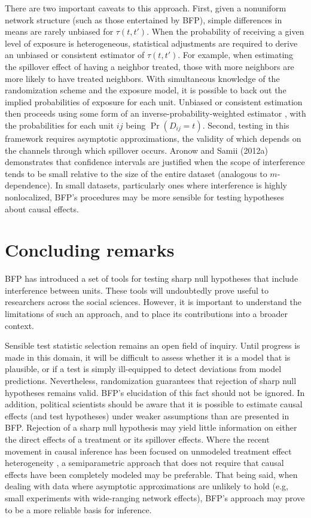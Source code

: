 \documentclass[12pt]{article}
\newcommand{\0}{\mathbf{0}}
\begin{document}
There are two important caveats to this approach. First, given a nonuniform network structure (such as those entertained by BFP), simple differences in means are rarely unbiased for $\tau(t,t')$. When the probability of receiving a given level of exposure is heterogeneous, statistical adjustments are required to derive an unbiased or consistent estimator of $\tau(t,t')$. For example, when estimating the spillover effect of having a neighbor treated, those with more neighbors are more likely to have treated neighbors. With simultaneous knowledge of the randomization scheme and the exposure model, it is possible to back out the implied probabilities of exposure for each unit. Unbiased or consistent estimation then proceeds using some form of an inverse-probability-weighted estimator \citep{horvitz52}, with the probabilities for each unit $ij$ being $\Pr(D_{ij} = t)$. Second, testing in this framework requires asymptotic approximations, the validity of which depends on the channels through which spillover occurs.
 Aronow and Samii (2012a) %
 demonstrates that confidence intervals are justified when the scope of interference tends to be small relative to the size of the entire dataset (analogous to $m$-dependence). In small datasets, particularly ones where interference is highly nonlocalized, BFP's procedures may be more sensible for testing hypotheses about causal effects.

\section*{Concluding remarks}

BFP has introduced a set of tools for testing sharp null hypotheses that include interference between units. These tools will undoubtedly prove useful to researchers across the social sciences. However, it is important to understand the limitations of such an approach, and to place its contributions into a broader context. 

Sensible test statistic selection remains an open field of inquiry. Until progress is made in this domain, it will be difficult to assess whether it is a model that is plausible, or if a test is simply ill-equipped to detect deviations from model predictions. Nevertheless, randomization guarantees that rejection of sharp null hypotheses remains valid. BFP's elucidation of this fact should not be ignored. 
In addition, political scientists should be aware that it is possible to estimate causal effects (and test hypotheses) under weaker assumptions than are presented in BFP. Rejection of a sharp null hypothesis may yield little information on either the direct effects of a treatment or its spillover effects. Where the recent movement in causal inference has been focused on unmodeled treatment effect heterogeneity \citep[e.g.,][]{angristpischke}, a semiparametric approach that does not require that causal effects have been completely modeled may be preferable. That being said, when dealing with data where asymptotic approximations are unlikely to hold (e.g, small experiments with wide-ranging network effects), BFP's approach may prove to be a more reliable basis for inference.
\end{document}
